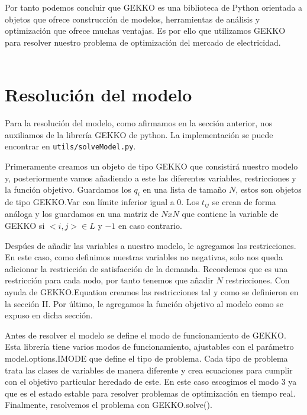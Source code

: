 \documentclass[twoside]{article}
\begin{document}
\begin{multicols}{2}
Por tanto podemos concluir que GEKKO es una biblioteca de Python orientada a objetos que ofrece construcci\'on de modelos, herramientas de an\'alisis y optimizaci\'on que ofrece muchas ventajas. Es por ello que utilizamos GEKKO para resolver nuestro problema de optimizaci\'on del mercado de electricidad.\\\\



\section{Resoluci\'on del modelo}

Para la resoluci\'on del modelo, como afirmamos en la secci\'on anterior, nos auxiliamos de la librer\'ia GEKKO de python. La implementaci\'on se puede encontrar en \texttt{utils/solveModel.py}.

Primeramente creamos un objeto de tipo GEKKO que consistir\'a nuestro modelo y, posteriormente vamos a\~nadiendo a este las diferentes variables, restricciones y la funci\'on objetivo. Guardamos los $q_i$ en una lista de tama\~no $N$, estos son objetos de tipo \textsf{GEKKO.Var} con l\'imite inferior igual a $0$. Los $t_{ij}$ se crean de forma an\'aloga y los guardamos en una matriz de $NxN$ que contiene la variable de GEKKO si $<i,j> \in L$ y $-1$ en caso contrario. 

Desp\'ues de a\~nadir las variables a nuestro modelo, le agregamos las restricciones. En este caso, como definimos nuestras variables no negativas, solo nos queda adicionar la restricci\'on de satisfacci\'on de la demanda. Recordemos que es una restricci\'on para cada nodo, por tanto tenemos que a\~nadir $N$ restricciones. Con ayuda de \textsf{GEKKO.Equation} creamos las restricciones tal y como se definieron en la secci\'on II. Por \'ultimo, le agregamos la funci\'on objetivo al modelo como se expuso en dicha secci\'on.

Antes de resolver el modelo se define el modo de funcionamiento de GEKKO. Esta librer\'ia tiene varios modos de funcionamiento, ajustables con el par\'ametro \textsf{model.options.IMODE} que define el tipo de problema. Cada tipo de problema trata las clases de variables de manera diferente y crea ecuaciones para cumplir con el objetivo particular heredado de este. En este caso escogimos el modo 3 ya que es el estado estable para resolver problemas de optimizaci\'on en tiempo real. Finalmente, resolvemos el problema con \textsf{GEKKO.solve()}. 


\end{multicols}
\end{document}
